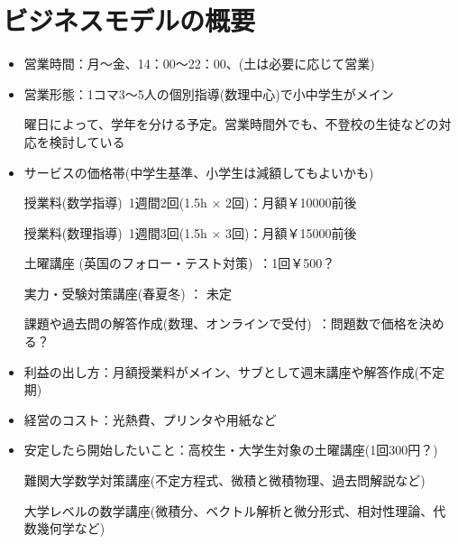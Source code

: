 ﻿\documentclass[12pt]{article}
\begin{document}
\section{ビジネスモデルの概要}
\begin{itemize}[leftmargin=1.5em, itemsep=4mm, parsep=5pt]
  \item 営業時間：月～金、14：00～22：00、(土は必要に応じて営業)
  \item 営業形態：1コマ3～5人の個別指導(数理中心)で小中学生がメイン
  
  曜日によって、学年を分ける予定。営業時間外でも、不登校の生徒などの対応を検討している
  
  \item サービスの価格帯(中学生基準、小学生は減額してもよいかも) %
  
  授業料(数学指導)\ 1週間2回(1.5h $\times$ 2回)：月額￥10000前後
  
  授業料(数理指導)\ 1週間3回(1.5h $\times$ 3回)：月額￥15000前後
  
  土曜講座 (英国のフォロー・テスト対策)\ ：1回￥500？
  
  実力・受験対策講座(春夏冬) ： 未定
  
  課題や過去問の解答作成(数理、オンラインで受付)\ ：問題数で価格を決める？
  
  \item 利益の出し方：月額授業料がメイン、サブとして週末講座や解答作成(不定期)
  \item 経営のコスト：光熱費、プリンタや用紙など %
  \item 安定したら開始したいこと：高校生・大学生対象の土曜講座(1回300円？)
  
  難関大学数学対策講座(不定方程式、微積と微積物理、過去問解説など)
  
  大学レベルの数学講座(微積分、ベクトル解析と微分形式、相対性理論、代数幾何学など)
\end{itemize}

\newpage
\end{document}
